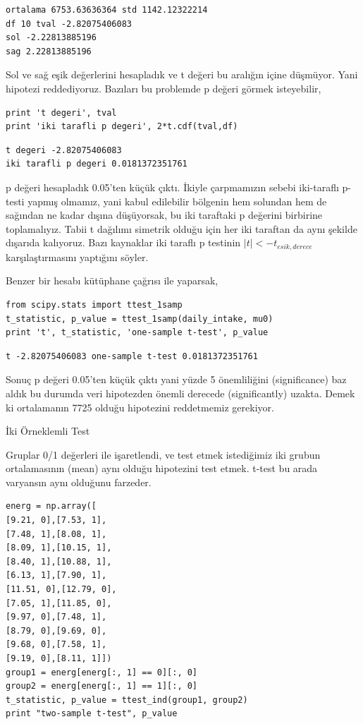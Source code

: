 \documentclass[12pt,fleqn]{article}\usepackage{../../common}
\begin{document}
\begin{verbatim}
ortalama 6753.63636364 std 1142.12322214
df 10 tval -2.82075406083
sol -2.22813885196
sag 2.22813885196
\end{verbatim}

Sol ve sağ eşik değerlerini hesapladık ve t değeri bu aralığın içine
düşmüyor. Yani hipotezi reddediyoruz. Bazıları bu problemde p değeri görmek
isteyebilir, 

\begin{verbatim}
print 't degeri', tval
print 'iki tarafli p degeri', 2*t.cdf(tval,df)
\end{verbatim}

\begin{verbatim}
t degeri -2.82075406083
iki tarafli p degeri 0.0181372351761
\end{verbatim}

p değeri hesapladık 0.05'ten küçük çıktı. İkiyle çarpmamızın sebebi
iki-taraflı p-testi yapmış olmamız, yani kabul edilebilir bölgenin hem
solundan hem de sağından ne kadar dışına düşüyorsak, bu iki taraftaki p
değerini birbirine toplamalıyız. Tabii t dağılımı simetrik olduğu için her
iki taraftan da aynı şekilde dışarıda kalıyoruz. Bazı kaynaklar iki taraflı
p testinin $|t| < -t_{esik,derece}$ karşılaştırmasını yaptığını söyler.

Benzer bir hesabı kütüphane çağrısı ile yaparsak,

\begin{verbatim}
from scipy.stats import ttest_1samp
t_statistic, p_value = ttest_1samp(daily_intake, mu0)
print 't', t_statistic, 'one-sample t-test', p_value
\end{verbatim}

\begin{verbatim}
t -2.82075406083 one-sample t-test 0.0181372351761
\end{verbatim}

Sonuç p değeri 0.05'ten küçük çıktı yani yüzde 5 önemliliğini
(significance) baz aldık bu durumda veri hipotezden önemli derecede
(significantly) uzakta. Demek ki ortalamanın 7725 olduğu hipotezini
reddetmemiz gerekiyor.

İki Örneklemli Test

Gruplar 0/1 değerleri ile işaretlendi, ve test etmek istediğimiz iki grubun
ortalamasının (mean) aynı olduğu hipotezini test etmek. t-test bu arada
varyansın aynı olduğunu farzeder.

\begin{verbatim}
energ = np.array([
[9.21, 0],[7.53, 1],
[7.48, 1],[8.08, 1],
[8.09, 1],[10.15, 1],
[8.40, 1],[10.88, 1],
[6.13, 1],[7.90, 1],
[11.51, 0],[12.79, 0],
[7.05, 1],[11.85, 0],
[9.97, 0],[7.48, 1],
[8.79, 0],[9.69, 0],
[9.68, 0],[7.58, 1],
[9.19, 0],[8.11, 1]])
group1 = energ[energ[:, 1] == 0][:, 0]
group2 = energ[energ[:, 1] == 1][:, 0]
t_statistic, p_value = ttest_ind(group1, group2)
print "two-sample t-test", p_value
\end{verbatim}
\end{document}
